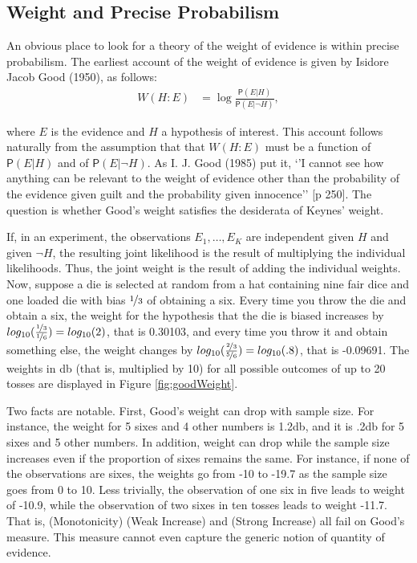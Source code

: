 \documentclass[
  10pt,
  dvipsnames,enabledeprecatedfontcommands]{scrartcl}
\newcommand{\pr}[1]{\mathsf{P}(#1)}
\begin{document}
\hypertarget{weight-and-precise-probabilism}{%
\subsection{Weight and Precise
Probabilism}\label{weight-and-precise-probabilism}}

An obvious place to look for a theory of the weight of evidence is
within precise probabilism. The earliest account of the weight of
evidence is given by Isidore Jacob Good (1950), as follows:
\begin{align*}
W(H:E) & = \log \frac{\pr{E \vert H}}{\pr{E\vert \neg H}},
\end{align*}

\noindent where \(E\) is the evidence and \(H\) a hypothesis of
interest. This account follows naturally from the assumption that that
\(W(H:E)\) must be a function of \(\pr{E\vert H}\) and of
\(\pr{E\vert \neg H}\). As I. J. Good (1985) put it, `'I cannot see how
anything can be relevant to the weight of evidence other than the
probability of the evidence given guilt and the probability given
innocence'' {[}p 250{]}. The question is whether Good's weight satisfies
the desiderata of Keynes' weight.

If, in an experiment, the observations \(E_1, \dots, E_K\) are
independent given \(H\) and given \(\neg H\), the resulting joint
likelihood is the result of multiplying the individual likelihoods.
Thus, the joint weight is the result of adding the individual weights.
Now, suppose a die is selected at random from a hat containing nine fair
dice and one loaded die with bias \(\nicefrac{1}{3}\) of obtaining a
six. Every time you throw the die and obtain a six, the weight for the
hypothesis that the die is biased increases by
\(log_{10}(\frac{\nicefrac{1}{3}}{\nicefrac{1}{6}})= log_{10}(2)\), that
is 0.30103, and every time you throw it and obtain something else, the
weight changes by
\(log_{10}(\frac{\nicefrac{2}{3}}{\nicefrac{5}{6}})= log_{10}(.8)\),
that is -0.09691. The weights in db (that is, multiplied by 10) for all
possible outcomes of up to 20 tosses are displayed in Figure
\ref{fig:goodWeight}. 

Two facts are notable. First, Good's weight can drop with sample size.
For instance, the weight for 5 sixes and 4 other numbers is 1.2db, and
it is .2db for 5 sixes and 5 other numbers. In addition, weight can drop
while the sample size increases even if the proportion of sixes remains
the same. For instance, if none of the observations are sixes, the
weights go from -10 to -19.7 as the sample size goes from 0 to 10. Less
trivially, the observation of one six in five leads to weight of -10.9,
while the observation of two sixes in ten tosses leads to weight -11.7.
That is, (Monotonicity) (Weak Increase) and (Strong Increase) all fail
on Good's measure. This measure cannot even capture the generic notion
of quantity of evidence.
\end{document}
